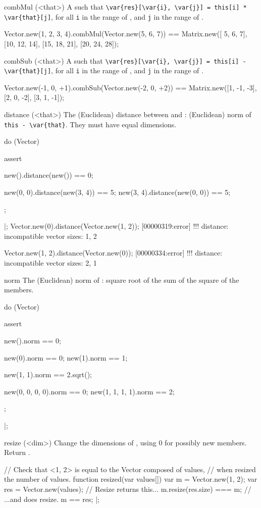 \begin{urbiscriptapi}
\item[combMul](<that>)%
  A   such that
  \lstinline|\var{res}[\var{i}, \var{j}] = this[i] * \var{that}[j]|, for all
  \lstinline|i| in the range of \this, and \lstinline|j| in the range of
  \that.
\begin{urbiassert}
Vector.new(1, 2, 3, 4).combMul(Vector.new(5, 6, 7))
  == Matrix.new([ 5,  6,  7],
                [10, 12, 14],
                [15, 18, 21],
                [20, 24, 28]);
\end{urbiassert}


\item[combSub](<that>)%
  A   such that
  \lstinline|\var{res}[\var{i}, \var{j}] = this[i] - \var{that}[j]|, for all
  \lstinline|i| in the range of \this, and \lstinline|j| in the range of
  \that.
\begin{urbiassert}
Vector.new(-1, 0, +1).combSub(Vector.new(-2, 0, +2))
  == Matrix.new([1, -1, -3],
                [2,  0, -2],
                [3,  1, -1]);
\end{urbiassert}


\item[distance](<that>)%
  The (Euclidean) distance between \this and \that: (Euclidean) norm of
  \lstinline|this - \var{that}|.  They must have equal dimensions.
\begin{urbiscript}
do (Vector)
{
  assert
  {
    new().distance(new()) == 0;

    new(0, 0).distance(new(3, 4)) == 5;
    new(3, 4).distance(new(0, 0)) == 5;
  };
}|;
Vector.new(0).distance(Vector.new(1, 2));
[00000319:error] !!! distance: incompatible vector sizes: 1, 2

Vector.new(1, 2).distance(Vector.new(0));
[00000334:error] !!! distance: incompatible vector sizes: 2, 1
\end{urbiscript}


\item[norm]%
  The (Euclidean) norm of \this: square root of the sum of the square of the
  members.
\begin{urbiscript}
do (Vector)
{
  assert
  {
    new().norm == 0;

    new(0).norm == 0;
    new(1).norm == 1;

    new(1, 1).norm == 2.sqrt();

    new(0, 0, 0, 0).norm == 0;
    new(1, 1, 1, 1).norm == 2;
  };
}|;
\end{urbiscript}


\item[resize](<dim>)%
  Change the dimensions of \this, using 0 for possibly new members.  Return
  \this.
\begin{urbiscript}
// Check that <1, 2> is equal to the Vector composed of values,
// when resized the number of values.
function resized(var values[])
{
  var m = Vector.new(1, 2);
  var res = Vector.new(values);
  // Resize returns this...
  m.resize(res.size) === m;
  // ...and does resize.
  m == res;
}|;


\end{urbiscript}
\end{urbiscriptapi}
